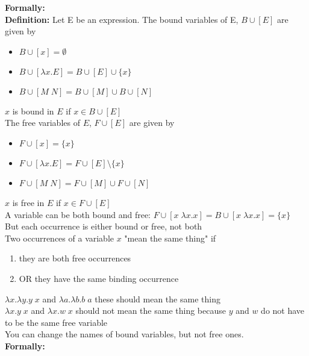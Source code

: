 \documentclass[11pt]{article}
\begin{document}
\textbf{Formally:} \\

\textbf{Definition:} Let E be an expression. The bound variables of E, $B \cup [E]$ are given by 
\begin{itemize}
	\item[] $B \cup [x] = \emptyset$
	\item[] $B \cup [\lambda x.E] = B \cup [E] \cup \{x\}$
	\item[] $B \cup [M\;N] = B \cup [M] \cup B \cup [N]$
\end{itemize}


$x$ is bound in $E$ if $x \in B \cup [E]$ \\

The free variables of $E$, $F \cup [E]$ are given by
\begin{itemize}
	\item[] $F \cup [x] = \{x\}$
	\item[] $F \cup [\lambda x.E] = F \cup [E] \setminus \{x\}$
	\item[] $F \cup [M\;N] = F \cup [M] \cup F \cup [N]$
\end{itemize}

$x$ is free in $E$ if $x \in F \cup [E]$ \\

A variable can be both bound and free: $F \cup [x\; \lambda x.x] = B \cup [x\; \lambda x.x] = \{x\}$ \\

But each occurrence is either bound or free, not both \\

Two occurrences of a variable $x$ "mean the same thing" if
\begin{enumerate}
\item they are both free occurrences
\item OR they have the same binding occurrence
\end{enumerate}

$\lambda x.\lambda y.y\;x$ and $\lambda a.\lambda b.b\;a$ these should mean the same thing \\

$\lambda x.y\;x$ and $\lambda x.w\;x$ should not mean the same thing because $y$ and $w$ do not have to be the same free variable \\

You can change the names of bound variables, but not free ones. \\

\textbf{Formally:} \\
\end{document}
